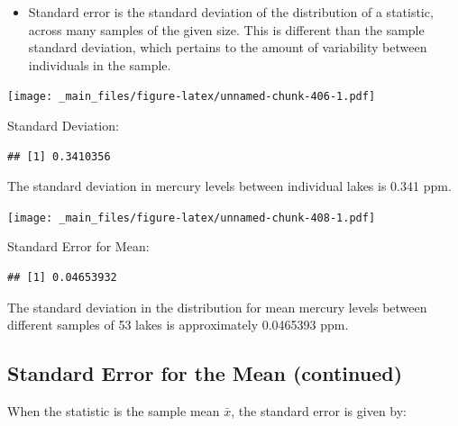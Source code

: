 \documentclass[]{book}
\newenvironment{Shaded}{\begin{snugshade}}{\end{snugshade}}
\newcommand{\KeywordTok}[1]{\textcolor[rgb]{0.13,0.29,0.53}{\textbf{#1}}}
\newcommand{\StringTok}[1]{\textcolor[rgb]{0.31,0.60,0.02}{#1}}
\newcommand{\OperatorTok}[1]{\textcolor[rgb]{0.81,0.36,0.00}{\textbf{#1}}}
\newcommand{\NormalTok}[1]{#1}
\providecommand{\tightlist}{%
  \setlength{\itemsep}{0pt}\setlength{\parskip}{0pt}}
\begin{document}
\begin{itemize}
\tightlist
\item
  Standard error is the standard deviation of the distribution of a
  statistic, across many samples of the given size. This is different
  than the sample standard deviation, which pertains to the amount of
  variability between individuals in the sample.
\end{itemize}

\texttt{[image: \_main\_files/figure-latex/unnamed-chunk-406-1.pdf]}

Standard Deviation:

\begin{Shaded}
\end{Shaded}

\begin{verbatim}
## [1] 0.3410356
\end{verbatim}

The standard deviation in mercury levels between individual lakes is
0.341 ppm.

\texttt{[image: \_main\_files/figure-latex/unnamed-chunk-408-1.pdf]}

Standard Error for Mean:

\begin{Shaded}
\end{Shaded}

\begin{verbatim}
## [1] 0.04653932
\end{verbatim}

The standard deviation in the distribution for mean mercury levels
between different samples of 53 lakes is approximately 0.0465393 ppm.

\subsection{Standard Error for the Mean
(continued)}\label{standard-error-for-the-mean-continued}

When the statistic is the sample mean \(\bar{x}\), the standard error is
given by:
\end{document}
